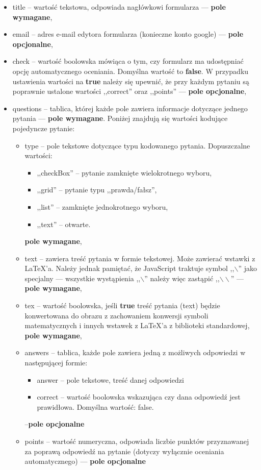 \begin{itemize}
\item{title} -- wartość tekstowa, odpowiada nagłówkowi formularza ---  \textbf{pole wymagane},
\item{email} -- adres e-mail edytora formularza (konieczne konto google) --- \textbf{pole opcjonalne},
\item{check} -- wartość boolowska mówiąca o tym, czy formularz ma udostępniać opcję automatycznego oceniania. Domyślna wartość to \textbf{false}. W przypadku ustawienia wartości na \textbf{true} należy się upewnić, że przy każdym pytaniu są poprawnie ustalone wartości ,,correct'' oraz ,,points'' --- \textbf{pole opcjonalne},
\item{questions} -- tablica, której każde pole zawiera informacje dotyczące jednego pytania --- \textbf{pole wymagane}. Poniżej znajdują się wartości kodujące pojedyncze pytanie:
\begin{itemize}
\item{type} -- pole tekstowe dotyczące typu kodowanego pytania. Dopuszczalne wartości:
\begin{itemize}
\item ,,checkBox'' -- pytanie zamknięte wielokrotnego wyboru,
\item ,,grid'' -- pytanie typu ,,prawda/fałsz'',
\item ,,list'' -- zamknięte jednokrotnego wyboru,
\item ,,text'' -- otwarte.
\end{itemize}
 \textbf{pole wymagane},
\item{text} -- zawiera treść pytania w formie tekstowej. Może zawierać wstawki z \LaTeX{}'a. Należy jednak pamiętać, że JavaScript traktuje symbol ,,$\backslash$'' jako specjalny --- wszystkie wystąpienia ,,$\backslash$'' należy więc zastąpić ,,$\backslash\backslash$'' --- \textbf{pole wymagane},
\item{tex} -- wartość boolowska, jeśli \textbf{true} treść pytania (text) będzie konwertowana do obrazu z zachowaniem konwersji symboli matematycznych i innych wstawek z \LaTeX{}'a z biblioteki standardowej, \textbf{pole wymagane},
\item{answers} -- tablica, każde pole zawiera jedną z możliwych odpowiedzi w następującej formie:
\begin{itemize}
\item answer -- pole tekstowe, treść danej odpowiedzi
\item correct -- wartość boolowska wskazująca czy dana odpowiedź jest prawidłowa. Domyślna wartość: false.
\end{itemize} 
--\textbf{pole opcjonalne}
\item{points} -- wartość numeryczna, odpowiada liczbie punktów przyznawanej za poprawą odpowiedź na pytanie (dotyczy wyłącznie oceniania automatycznego) --- \textbf{pole opcjonalne}
\end{itemize}
\end{itemize}









